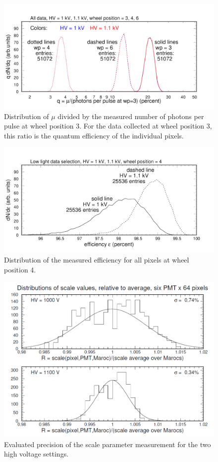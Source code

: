 \begin{figure}
	\centering
	\includegraphics[width=0.95\linewidth]{figures/pglobal_qe_all.pdf}
	\caption{Distribution of $\mu$ divided by the measured number of photons per pulse at wheel position 3. For the data collected at wheel position 3, this ratio is the quantum efficiency of the individual pixels.}
	\label{fig:pglobal_qe_all}
\end{figure}

\begin{figure}
	\centering
	\includegraphics[width=0.95\linewidth]{figures/pglobal_eff.pdf}
	\caption{Distribution of the measured efficiency for all pixels at wheel position 4.}
	\label{fig:pglobal_eff}
\end{figure}

\begin{figure}
	\centering
	\includegraphics[width=0.95\linewidth]{figures/R_scale_maroc_avg.png}
	\caption{Evaluated precision of the scale parameter measurement for the two high voltage settings.}
	\label{fig:R_scale_maroc_avg}
\end{figure}


